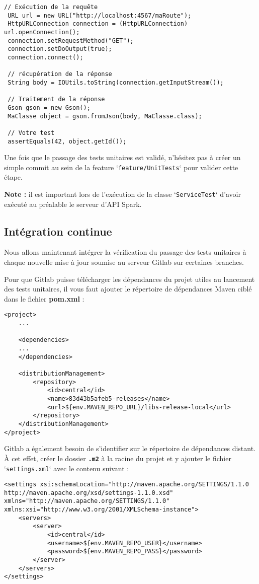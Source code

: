 \documentclass[11pt,a4paper,oneside]{article}
\begin{document}
\begin{lstlisting}[style=customJava]
 // Exécution de la requête
 URL url = new URL("http://localhost:4567/maRoute");
 HttpURLConnection connection = (HttpURLConnection) url.openConnection();
 connection.setRequestMethod("GET");
 connection.setDoOutput(true);
 connection.connect();

 // récupération de la réponse
 String body = IOUtils.toString(connection.getInputStream());

 // Traitement de la réponse
 Gson gson = new Gson();
 MaClasse object = gson.fromJson(body, MaClasse.class);
 
 // Votre test
 assertEquals(42, object.getId());
\end{lstlisting}


\vspace{5mm}
Une fois que le passage des tests unitaires est validé, n'hésitez pas à créer un simple commit au sein de la feature `\texttt{feature/UnitTests}` pour valider cette étape.

\vspace{5mm}
\textbf{Note :} il est important lors de l'exécution de la classe `\texttt{ServiceTest}` d'avoir exécuté au préalable le serveur d'API Spark.

\subsection{Intégration continue}

Nous allons maintenant intégrer la vérification du passage des tests unitaires à chaque nouvelle mise à jour soumise au serveur Gitlab sur certaines branches.

\vspace{5mm}
Pour que Gitlab puisse télécharger les dépendances du projet utiles au lancement des tests unitaires, il vous faut ajouter le répertoire de dépendances Maven ciblé dans le fichier \textbf{pom.xml} :
\begin{lstlisting}[style=customXML]
<project>
	...

	<dependencies>
	...		
	</dependencies>
	
	<distributionManagement>
		<repository>
			<id>central</id>
			<name>83d43b5afeb5-releases</name>
			<url>${env.MAVEN_REPO_URL}/libs-release-local</url>
		</repository>
	</distributionManagement>
</project>
\end{lstlisting}

\vspace{5mm}
Gitlab a également besoin de s'identifier sur le répertoire de dépendances distant. À cet effet, créer le dossier \textbf{\texttt{.m2}} à la racine du projet et y ajouter le fichier `\texttt{settings.xml}` avec le contenu suivant :
\begin{lstlisting}[style=customXML]
<settings xsi:schemaLocation="http://maven.apache.org/SETTINGS/1.1.0 http://maven.apache.org/xsd/settings-1.1.0.xsd" xmlns="http://maven.apache.org/SETTINGS/1.1.0" xmlns:xsi="http://www.w3.org/2001/XMLSchema-instance">
	<servers>
		<server>
			<id>central</id>
			<username>${env.MAVEN_REPO_USER}</username>
			<password>${env.MAVEN_REPO_PASS}</password>
		</server>
	</servers>
</settings>
\end{lstlisting}
\end{document}
